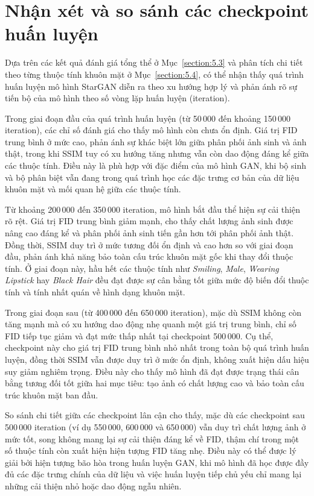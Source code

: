 \documentclass[../DoAn.tex]{subfiles}
\begin{document}
\section{Nhận xét và so sánh các checkpoint huấn luyện}
\label{section:5.5}

Dựa trên các kết quả đánh giá tổng thể ở Mục~\ref{section:5.3} và phân tích chi tiết theo từng thuộc tính khuôn mặt ở Mục~\ref{section:5.4}, có thể nhận thấy quá trình huấn luyện mô hình StarGAN diễn ra theo xu hướng hợp lý và phản ánh rõ sự tiến bộ của mô hình theo số vòng lặp huấn luyện (iteration).

Trong giai đoạn đầu của quá trình huấn luyện (từ 50\,000 đến khoảng 150\,000 iteration), các chỉ số đánh giá cho thấy mô hình còn chưa ổn định. Giá trị FID trung bình ở mức cao, phản ánh sự khác biệt lớn giữa phân phối ảnh sinh và ảnh thật, trong khi SSIM tuy có xu hướng tăng nhưng vẫn còn dao động đáng kể giữa các thuộc tính. Điều này là phù hợp với đặc điểm của mô hình GAN, khi bộ sinh và bộ phân biệt vẫn đang trong quá trình học các đặc trưng cơ bản của dữ liệu khuôn mặt và mối quan hệ giữa các thuộc tính.

Từ khoảng 200\,000 đến 350\,000 iteration, mô hình bắt đầu thể hiện sự cải thiện rõ rệt. Giá trị FID trung bình giảm mạnh, cho thấy chất lượng ảnh sinh được nâng cao đáng kể và phân phối ảnh sinh tiến gần hơn tới phân phối ảnh thật. Đồng thời, SSIM duy trì ở mức tương đối ổn định và cao hơn so với giai đoạn đầu, phản ánh khả năng bảo toàn cấu trúc khuôn mặt gốc khi thay đổi thuộc tính. Ở giai đoạn này, hầu hết các thuộc tính như \textit{Smiling}, \textit{Male}, \textit{Wearing Lipstick} hay \textit{Black Hair} đều đạt được sự cân bằng tốt giữa mức độ biến đổi thuộc tính và tính nhất quán về hình dạng khuôn mặt.

Trong giai đoạn sau (từ 400\,000 đến 650\,000 iteration), mặc dù SSIM không còn tăng mạnh mà có xu hướng dao động nhẹ quanh một giá trị trung bình, chỉ số FID tiếp tục giảm và đạt mức thấp nhất tại checkpoint 500\,000. Cụ thể, checkpoint này cho giá trị FID trung bình nhỏ nhất trong toàn bộ quá trình huấn luyện, đồng thời SSIM vẫn được duy trì ở mức ổn định, không xuất hiện dấu hiệu suy giảm nghiêm trọng. Điều này cho thấy mô hình đã đạt được trạng thái cân bằng tương đối tốt giữa hai mục tiêu: tạo ảnh có chất lượng cao và bảo toàn cấu trúc khuôn mặt ban đầu.

So sánh chi tiết giữa các checkpoint lân cận cho thấy, mặc dù các checkpoint sau 500\,000 iteration (ví dụ 550\,000, 600\,000 và 650\,000) vẫn duy trì chất lượng ảnh ở mức tốt, song không mang lại sự cải thiện đáng kể về FID, thậm chí trong một số thuộc tính còn xuất hiện hiện tượng FID tăng nhẹ. Điều này có thể được lý giải bởi hiện tượng bão hòa trong huấn luyện GAN, khi mô hình đã học được đầy đủ các đặc trưng chính của dữ liệu và việc huấn luyện tiếp chủ yếu chỉ mang lại những cải thiện nhỏ hoặc dao động ngẫu nhiên.
\end{document}
